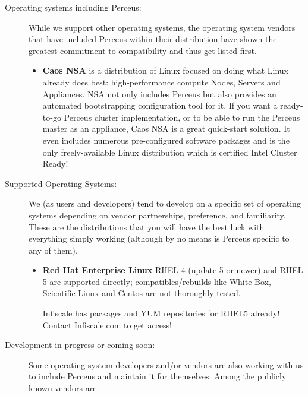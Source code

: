 \documentclass[10pt,letterpaper]{report}
\begin{document}
\begin{description}

\item[Operating systems including Perceus:] While we support other operating
systems, the operating system vendors that have included Perceus within their
distribution have shown the greatest commitment to compatibility and thus get
listed first.

\begin{itemize}

\item {\bf Caos NSA} is a distribution of Linux focused on doing what Linux
already does best: high-performance compute Nodes, Servers and Appliances.
NSA not only includes Perceus but also provides an automated bootstrapping
configuration tool for it.  If you want a ready-to-go Perceus cluster
implementation, or to be able to run the Perceus master as an appliance, Caos
NSA is a great quick-start solution.  It even includes numerous pre-configured
software packages and is the only freely-available Linux distribution which is
certified Intel Cluster Ready!

\end{itemize}

\item[Supported Operating Systems:] We (as users and developers) tend to
develop on a specific set of operating systems depending on vendor
partnerships, preference, and familiarity. These are the distributions that you
will have the best luck with everything simply working (although by no means is
Perceus specific to any of them).

\begin{itemize}

\item {\bf Red Hat Enterprise Linux} RHEL 4 (update 5 or newer) and RHEL 5 are
supported directly; compatibles/rebuilds like White Box, Scientific Linux and
Centos are not thoroughly tested.

Infiscale has packages and YUM repositories for RHEL5 already! Contact
Infiscale.com to get access!

\end{itemize}

\item[Development in progress or coming soon:] Some operating system developers
and/or vendors are also working with us to include Perceus and maintain it for
themselves. Among the publicly known vendors are:

\begin{itemize}


\end{itemize}
\end{description}
\end{document}
